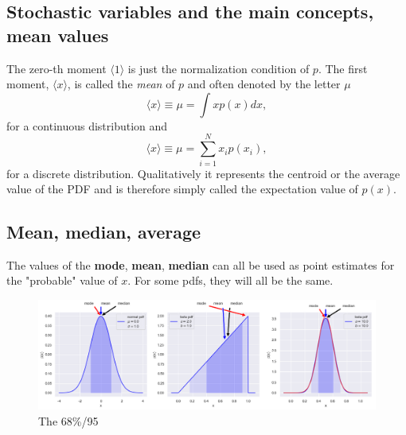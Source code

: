 \documentclass[%
oneside,                 %
final,                   %
10pt]{article}
\newenvironment{block_mdfboxadmon}[1][]{
\begin{block_mdfboxmdframed}[frametitle=#1]
}
{
\end{block_mdfboxmdframed}
}
\begin{document}
\subsection{Stochastic variables and the main concepts, mean values}

\begin{block_mdfboxadmon}[]
The zero-th moment $\langle 1\rangle$ is just the normalization condition of
$p$. The first moment, $\langle x\rangle$, is called the \emph{mean} of $p$
and often denoted by the letter $\mu$
\begin{equation*}
\langle x\rangle  \equiv \mu = \int x p(x)dx,
\end{equation*}
for a continuous distribution and 
\begin{equation*}
\langle x\rangle  \equiv \mu = \sum_{i=1}^N x_i p(x_i),
\end{equation*}
for a discrete distribution. 
Qualitatively it represents the centroid or the average value of the
PDF and is therefore simply called the expectation value of $p(x)$.
\end{block_mdfboxadmon} %



\subsection{Mean, median, average}

\begin{block_mdfboxadmon}[]
The values of the \textbf{mode}, \textbf{mean}, \textbf{median} can all be used as point estimates for the "probable" value of $x$. For some pdfs, they will all be the same.
\end{block_mdfboxadmon} %




\begin{figure}[!ht]  %
  \centerline{\includegraphics[width=1.0\linewidth]{fig/pdfs.png}}
  \caption{
  The 68\%/95%
  }
\end{figure}
\end{document}
